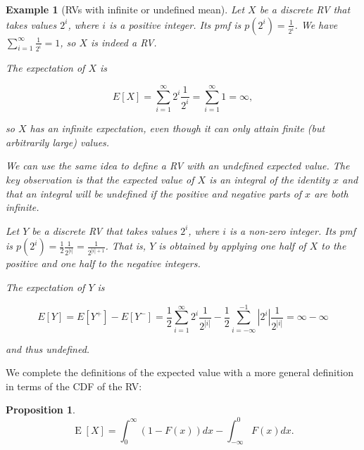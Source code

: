 \documentclass{book}
\theoremstyle{plain}%
\newtheorem{prototheorem}{Example}[section]
\newenvironment{cexample}
   {\colorlet{shadecolor}{gray!10}\begin{shaded}\begin{prototheorem}}
   {\end{prototheorem}\end{shaded}}
\newtheorem{proposition}{Proposition}[section]
\theoremstyle{definition}
\DeclareMathOperator{\E}{E}
\begin{document}
\begin{cexample}[RVs with infinite or undefined mean]
Let $X$ be a discrete RV that takes values $2^i$, where $i$ is a positive integer. Its pmf is $p(2^i) = \frac{1}{2^i}$. We have $\sum_{i=1}^\infty  \frac{1}{2^i} = 1$, so $X$ is indeed a RV.

The expectation of $X$ is

$$E[X] = \sum_{i=1}^\infty 2^i\frac{1}{2^i} = \sum_{i=1}^\infty 1 = \infty,$$

so $X$ has an infinite expectation, even though it can only attain finite (but arbitrarily large) values.

We can use the same idea to define a RV with an undefined expected value. The key observation is that the expected value of $X$ is an integral of the identity $x$ and that an integral will be undefined if the positive and negative parts of $x$ are both infinite.

Let $Y$ be a discrete RV that takes values $2^i$, where $i$ is a non-zero integer. Its pmf is $p(2^i) = \frac{1}{2} \frac{1}{2^{|i|}} = \frac{1}{2^{|i|+1}}$. That is, $Y$ is obtained by applying one half of $X$ to the positive and one half to the negative integers.

The expectation of $Y$ is

$$E[Y] = E[Y^+] - E[Y^-] = \frac{1}{2}\sum_{i=1}^\infty 2^i\frac{1}{2^{|i|}} - \frac{1}{2}\sum_{i=-\infty}^{-1} |2^i|\frac{1}{2^{|i|}} = \infty - \infty$$

and thus undefined.
\end{cexample}

We complete the definitions of the expected value with a more general definition in terms of the CDF of the RV:

\begin{proposition}
$$\E[X] = \int_0^\infty (1 - F(x)) dx - \int_{-\infty}^0 F(x) dx.$$
\end{proposition}
\end{document}

